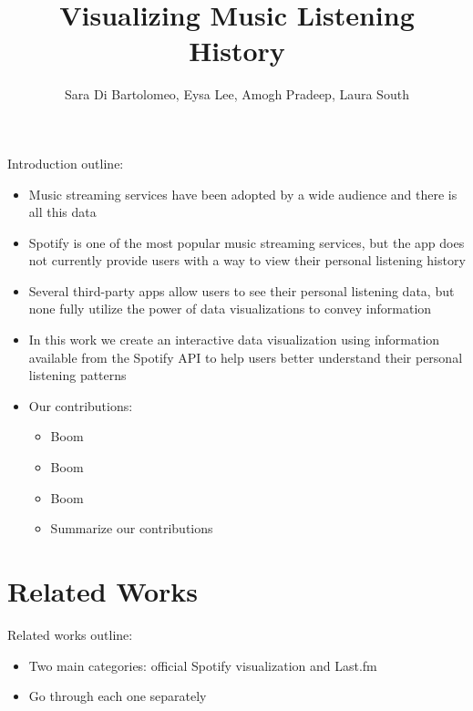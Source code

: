 \documentclass[journal]{vgtc}                %
\title{Visualizing Music Listening History}
\author{Sara Di Bartolomeo, Eysa Lee, Amogh Pradeep, Laura South}
\begin{document}


\maketitle

Introduction outline:
\begin{itemize}
  \item Music streaming services have been adopted by a wide audience and there is all this data

  \item Spotify is one of the most popular music streaming services, but the app does not currently provide users with a way to view their personal listening history
  
  \item Several third-party apps allow users to see their personal listening data, but none fully utilize the power of data visualizations to convey information

  \item In this work we create an interactive data visualization using information available from the Spotify API to help users better understand their personal listening patterns
  
  \item Our contributions:
  \begin{itemize}
    \item Boom
    \item Boom
    \item Boom
    \item Summarize our contributions
  \end{itemize}
\end{itemize}

\section{Related Works}
Related works outline:
\begin{itemize}
  \item Two main categories: official Spotify visualization and Last.fm
  \item Go through each one separately
\end{itemize}
\end{document}
